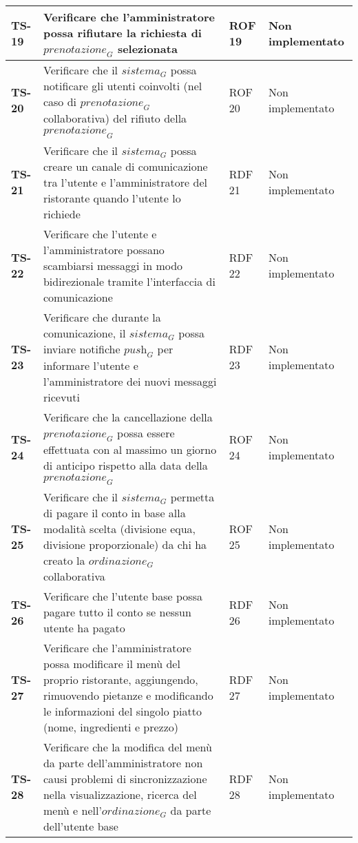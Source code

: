 \begin{longtable}{|>{\centering\arraybackslash}p{1.5cm}|p{9.8cm}|p{2cm}|p{3.5cm}|}
    \hline
    \rowcolor{gray!10}
    \textbf{TS-19} & Verificare che l'amministratore possa rifiutare la richiesta di $\textit{prenotazione}_G$ selezionata & ROF 19 & Non implementato \\ 
    \hline
    \rowcolor{gray!10}
    \textbf{TS-20} & Verificare che il $\textit{sistema}_G$ possa notificare gli utenti coinvolti (nel caso di $\textit{prenotazione}_G$ collaborativa) del rifiuto della $\textit{prenotazione}_G$ & ROF 20 & Non implementato \\ 
    \hline
    \rowcolor{gray!10}
    \textbf{TS-21} & Verificare che il $\textit{sistema}_G$ possa creare un canale di comunicazione tra l'utente e l'amministratore del ristorante quando l'utente lo richiede & RDF 21 & Non implementato \\
    \hline
    \rowcolor{gray!10}
    \textbf{TS-22} & Verificare che l'utente e l'amministratore possano scambiarsi messaggi in modo bidirezionale tramite l'interfaccia di comunicazione & RDF 22 & Non implementato \\ 
    \hline 
    \rowcolor{gray!10}
    \textbf{TS-23} & Verificare che durante la comunicazione, il $\textit{sistema}_G$ possa inviare notifiche $\textit{push}_G$ per informare l'utente e l'amministratore dei nuovi messaggi ricevuti & RDF 23 & Non implementato \\ 
    \hline
    \rowcolor{gray!10}
    \textbf{TS-24} & Verificare che la cancellazione della $\textit{prenotazione}_G$ possa essere effettuata con al massimo un giorno di anticipo rispetto alla data della $\textit{prenotazione}_G$ & ROF 24 & Non implementato \\
    \hline
    \rowcolor{gray!10}
    \textbf{TS-25} & Verificare che il $\textit{sistema}_G$ permetta di pagare il conto in base alla modalità scelta (divisione equa, divisione proporzionale) da chi ha creato la $\textit{ordinazione}_G$ collaborativa & ROF 25 & Non implementato \\
    \hline
    \rowcolor{gray!10}
    \textbf{TS-26} & Verificare che l'utente base possa pagare tutto il conto se nessun utente ha pagato & RDF 26 & Non implementato \\
    \hline
    \rowcolor{gray!10}
    \textbf{TS-27} & Verificare che l'amministratore possa modificare il menù del proprio ristorante, aggiungendo, rimuovendo pietanze e modificando le informazioni del singolo piatto (nome, ingredienti e prezzo) & RDF 27 & Non implementato \\
    \hline
    \rowcolor{gray!10}
    \textbf{TS-28} & Verificare che la modifica del menù da parte dell'amministratore non causi problemi di sincronizzazione nella visualizzazione, ricerca del menù e nell'$\textit{ordinazione}_G$ da parte dell'utente base & RDF 28 & Non implementato \\ 

\end{longtable}
